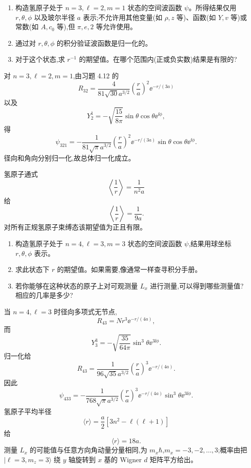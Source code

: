 \begin{question}
\begin{enumerate}
\item 构造氢原子处于 $n=3,\ell=2,m=1$ 状态的空间波函数 $\psi$。所得结果仅用 $r,\theta,\phi$ 以及玻尔半径 $a$ 表示;不允许用其他变量(如 $\rho,z$ 等)、函数(如 $Y,v$ 等)或常数(如 $A,c_0$ 等),但 $\pi,e,2$ 等允许使用。
\item 通过对 $r,\theta,\phi$ 的积分验证波函数是归一化的。
\item 对于这个状态,求 $r^{-1}$ 的期望值。在哪个范围内(正或负实数)结果是有限的?
\end{enumerate}
\end{question}
\begin{solution}

对 $n=3,\ell=2,m=1$,由习题 4.12 的
\[
R_{32}=\frac{4}{81\sqrt{30}a^{3/2}}\left(\frac{r}{a}\right)^2\ee^{-r/(3a)}
\]
以及
\[
Y_2^1=-\sqrt{\frac{15}{8\pi}}\sin\theta\cos\theta \ee^{\ii\phi},
\]
得
\[
\psi_{321}=-\frac{1}{81\sqrt{\pi}a^{3/2}}\left(\frac{r}{a}\right)^2\ee^{-r/(3a)}\sin\theta\cos\theta \ee^{\ii\phi}.
\]
径向和角向分别归一化,故总体归一化成立。

氢原子通式
\[
\left\langle\frac1r\right\rangle=\frac{1}{n^2a}
\]
给
\[
\left\langle\frac1r\right\rangle=\frac{1}{9a}.
\]
对所有正规氢原子束缚态该期望值为正且有限。

\end{solution}

\begin{question}
\begin{enumerate}
\item 构造氢原子处于 $n=4,\ell=3,m=3$ 状态的空间波函数 $\psi$,结果用球坐标 $r,\theta,\phi$ 表示。
\item 求此状态下 $r$ 的期望值。如果需要,像通常一样查寻积分手册。
\item 若你能够在这种状态的原子上对可观测量 $L_x$ 进行测量,可以得到哪些测量值?相应的几率是多少?
\end{enumerate}
\end{question}
\begin{solution}

当 $n=4,\ell=3$ 时径向多项式无节点,
\[
R_{43}=N r^3\ee^{-r/(4a)},
\]
而
\[
Y_3^3=-\sqrt{\frac{35}{64\pi}}\sin^3\theta \ee^{3\ii\phi}.
\]
归一化给
\[
R_{43}=\frac{1}{96\sqrt{35}a^{3/2}}\left(\frac{r}{a}\right)^3\ee^{-r/(4a)}.
\]
因此
\[
\psi_{433}=-\frac{1}{768\sqrt\pi a^{3/2}}\left(\frac{r}{a}\right)^3\ee^{-r/(4a)}\sin^3\theta \ee^{3\ii\phi}.
\]
氢原子平均半径
\[
\langle r\rangle=\frac{a}{2}[3n^2-\ell(\ell+1)]
\]
给
\[
\langle r\rangle=18a.
\]
测量 $L_x$ 的可能值与任意方向角动量分量相同,为 $m_x\hbar$,$m_x=-3,-2,\ldots,3$;概率由把 $|\ell=3,m_z=3\rangle$ 绕 $y$ 轴旋转到 $x$ 基的 Wigner $d$ 矩阵平方给出。

\end{solution}

